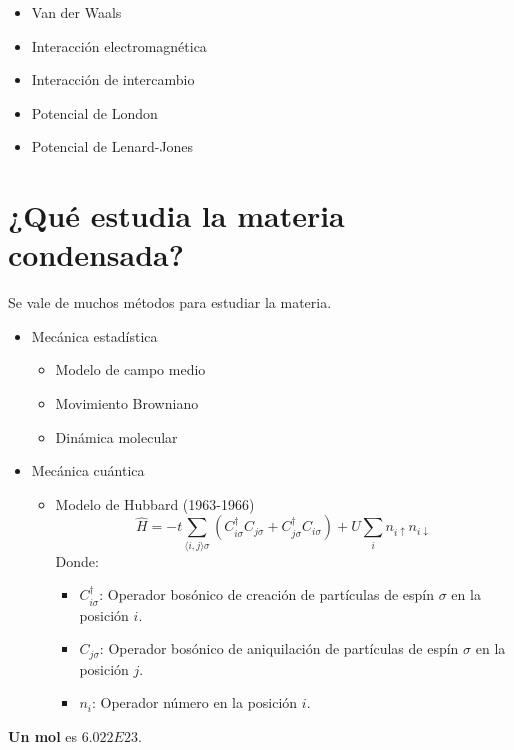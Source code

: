 \begin{itemize}
    \item Van der Waals
    \item Interacción electromagnética
    \item Interacción de intercambio
    \item Potencial de London
    \item Potencial de Lenard-Jones
\end{itemize}

\section{¿Qué estudia la materia condensada?}

Se vale de muchos métodos para estudiar la materia. 
\begin{itemize}
    \item Mecánica estadística
    \begin{itemize}
        \item Modelo de campo medio
        \item Movimiento Browniano
        \item Dinámica molecular
    \end{itemize}
    \item Mecánica cuántica
    \begin{itemize}
        \item Modelo de Hubbard (1963-1966)
        $$\hat{H}=-t\sum_{\langle i,j\rangle\sigma}\left(C_{i\sigma}^\dagger C_{j\sigma}+C_{j\sigma}^\dagger C_{i\sigma}\right)+U\sum_{i}n_{i\uparrow}n_{i\downarrow}$$
        Donde:
        \begin{itemize}
            \item $C_{i\sigma}^\dagger$: Operador bosónico de creación de partículas de espín $\sigma$ en la posición $i$.
            \item $C_{j\sigma}$: Operador bosónico de aniquilación de partículas de espín $\sigma$ en la posición $j$.
            \item $n_i$: Operador número en la posición $i$.
        \end{itemize}
    \end{itemize}
\end{itemize}

\textbf{Un mol} es $6.022E23$.

